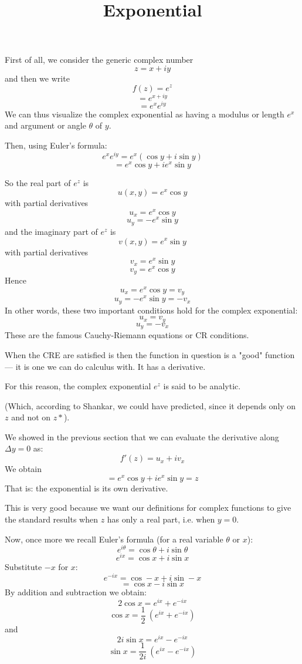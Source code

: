 \documentclass[11pt, oneside]{article}
\title{Exponential}
\date{}
\begin{document}
\maketitle
\Large

First of all, we consider the generic complex number
\[ z = x + iy \]
and then we write
\[ f(z) = e^z \]
\[ = e^{x + iy} \]
\[ = e^x e^{iy} \]
We can thus visualize the complex exponential as having a modulus or length $e^x$ and argument or angle $\theta$ of $y$.

Then, using Euler's formula:
\[ e^x e^{iy} = e^x (\cos y + i \sin y) \]
\[ = e^x \cos y + i e^x \sin y \]

So the real part of $e^z$ is 
\[ u(x,y) = e^x \cos y \]
with partial derivatives
\[ u_x = e^x \cos y \]
\[ u_y = - e^x \sin y \]
and the imaginary part of $e^z$ is 
\[ v(x,y) = e^x \sin y \]
with partial derivatives
\[ v_x = e^x \sin y \]
\[ v_y = e^x \cos y \]
Hence
\[ u_x = e^x \cos y = v_y \]
\[ u_y = - e^x \sin y = - v_x \]
In other words, these two important conditions hold for the complex exponential:
\[ u_x = v_y \]
\[ u_y = - v_x \]
These are the famous Cauchy-Riemann equations or CR conditions.  

When the CRE are satisfied is then the function in question is a "good" function --- it is one we can do calculus with.  It has a derivative.

For this reason, the complex exponential $e^z$ is said to be analytic. 

(Which, according to Shankar, we could have predicted, since it depends only on $z$ and not on $z*$).

We showed in the previous section that we can evaluate the derivative along $\Delta y =0$ as:
\[ f'(z) = u_x + iv_x  \]
We obtain
\[ = e^x \cos y + i e^x \sin y = z \]
That is:  the exponential is its own derivative.

This is very good because we want our definitions for complex functions to give the standard results when $z$ has only a real part, i.e. when $y=0$.

Now, once more we recall Euler's formula (for a real variable $\theta$ or $x$):
\[ e^{i \theta} = \cos \theta + i \sin \theta \]
\[ e^{i x} = \cos x + i \sin x \]
Substitute $-x$ for $x$:
\[ e^{-i x} = \cos -x + i \sin -x \]
\[ = \cos x - i \sin x \]
By addition and subtraction we obtain:
\[ 2 \cos x = e^{i x} + e^{-i x} \]
\[ \cos x = \frac{1}{2} \ (e^{i x} + e^{-i x}) \]
and
\[ 2i \sin x = e^{i x} - e^{-i x} \]
\[ \sin x = \frac{1}{2i} \ (e^{i x} - e^{-i x}) \]
\end{document}
